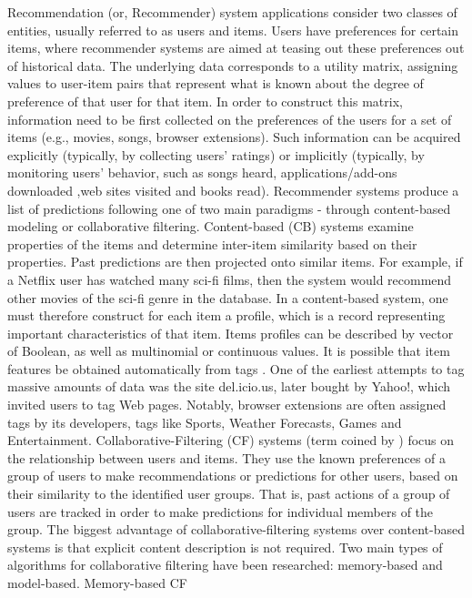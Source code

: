\documentclass[11pt,oneside]{book}
\begin{document}
Recommendation (or, Recommender) system applications \citep{resnick1997recommender} consider two
classes of entities, usually referred to as users and items. Users
have preferences for certain items, where recommender systems are
aimed at teasing out these preferences out of historical data. The
underlying data corresponds to a utility matrix, assigning values to
user-item pairs that represent what is known about the degree of
preference of that user for that item. In order to construct this
matrix, information need to be first collected on the preferences of
the users for a set of items (e.g., movies, songs, browser
extensions). Such information can be acquired explicitly (typically,
by collecting users’ ratings) or implicitly (typically, by
monitoring users’ behavior, such as songs heard, applications/add-ons
downloaded ,web sites visited and books read).  Recommender systems
produce a list of predictions following one of two main paradigms -
through content-based modeling or collaborative
filtering. Content-based (CB) systems examine properties of the items
and determine inter-item similarity based on their properties. Past
predictions are then projected onto similar items. For example, if a
Netflix user has watched many sci-fi films, then the system would
recommend other movies of the sci-fi genre in the database. In a
content-based system, one must therefore construct for each item a
profile, which is a record representing important characteristics of
that item. Items profiles can be described by vector of Boolean, as
well as multinomial or continuous values. It is possible that item
features be obtained automatically from tags \citep{golder2006usage}. One of the earliest
attempts to tag massive amounts of data was the site del.icio.us,
later bought by Yahoo!, which invited users to tag Web pages. Notably,
browser extensions are often assigned tags by its developers, tags
like Sports, Weather Forecasts, Games and Entertainment.
Collaborative-Filtering (CF) systems (term coined by \citep{goldberg1992using}) focus on the relationship between users and items. They
use the known preferences of a group of users to make recommendations
or predictions for other users, based on their similarity to the
identified user groups. That is, past actions of a group of users are
tracked in order to make predictions for individual members of the
group. The biggest advantage of collaborative-filtering systems over
content-based systems is that explicit content description is not
required. Two main types of algorithms for collaborative filtering
have been researched: memory-based and model-based.  Memory-based CF
\end{document}
